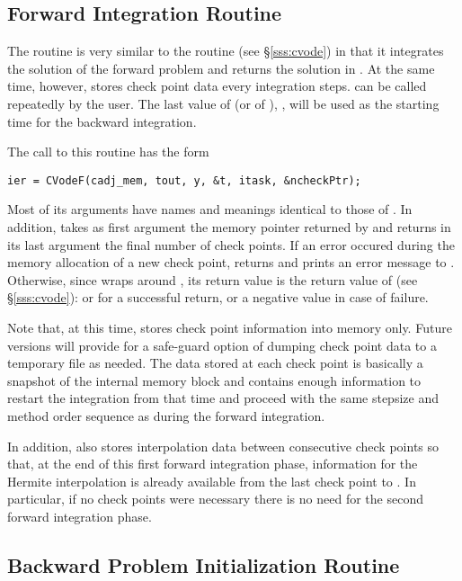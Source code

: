 \subsection{Forward Integration Routine}\label{sss:cvodef}

The routine  is very similar to the {\cvodes} routine 
(see \S\ref{sss:cvode}) in that it integrates the solution of the forward
problem and returns the solution in . At the same time,
however,  stores check point data every  integration steps.
 can be called repeatedly by the user. The last value of  
(or of ), , will be used as the starting time for the backward 
integration.

The call to this routine has the form
\begin{verbatim}
ier = CVodeF(cadj_mem, tout, y, &t, itask, &ncheckPtr);
\end{verbatim}
Most of its arguments have names and meanings identical to those of .
In addition,  takes as first argument the memory pointer 
returned by  and returns in its last argument the final number of 
check points. If an error occured during the memory allocation of a new check
point,  returns  and prints an error message to 
. Otherwise, since  wraps around , its return 
value  is the return value of  (see \S\ref{sss:cvode}): 
 or  for a successful return, 
or a negative value in case of failure.

Note that, at this time,  stores check point information into memory
only. Future versions will provide for a safe-guard option of dumping check point
data to a temporary file as needed. The data stored at each check point is basically
a snapshot of the {\cvodes} internal memory block and contains enough information
to restart the integration from that time and proceed with the same stepsize and
method order sequence as during the forward integration.

In addition,  also stores interpolation data between consecutive check points
so that, at the end of this first forward integration phase, information for the Hermite 
interpolation is already available from the last check point to . In particular,
if no check points were necessary there is no need for the second forward integration phase.

\subsection{Backward Problem Initialization Routine}\label{sss:cvodemallocb}

